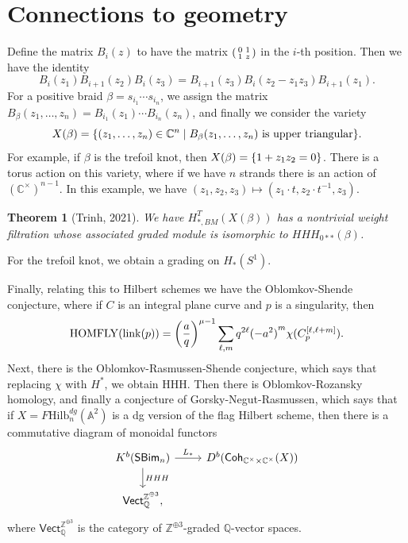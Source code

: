 \documentclass[leqno, openany]{memoir}
\newtheorem{thm}{Theorem}[section]
\theoremstyle{definition}
\theoremstyle{remark}
\theoremstyle{plain}
\theoremstyle{definition}
\theoremstyle{remark}
\newcommand{\A}{\mathbb{A}}
\newcommand{\C}{\mathbb{C}}
\newcommand{\Z}{\mathbb{Z}}
\newcommand{\Q}{\mathbb{Q}}
\newcommand{\mr}[1]{\mathrm{#1}}
\newcommand{\ms}[1]{\mathsf{#1}}
\begin{document}
\section{Connections to geometry}%
\label{sec:connections_to_geometry}

Define the matrix $B_i(z)$ to have the matrix $\begin{psmallmatrix}
    0 & 1 \\ 1 & z
\end{psmallmatrix}$ in the $i$-th position. Then we have the identity
\[ B_i(z_1) B_{i+1}(z_2) B_i(z_3) = B_{i+1}(z_3) B_i(z_2 - z_1 z_3) B_{i+1}(z_1). \]
For a positive braid $\beta = s_{i_1} \cdots s_{i_n}$, we assign the matrix $B_{\beta}(z_1, \ldots, z_n) = B_{i_1}(z_1) \cdots B_{i_n}(z_n)$, and finally we consider the variety 
\[ X(\beta) = \qty{(z_1, \ldots, z_n) \in \C^n \mid B_{\beta}(z_1, \ldots, z_n) \text{ is upper triangular}}. \]
For example, if $\beta$ is the trefoil knot, then $X(\beta) = \qty{1 + z_1 z_2 = 0}$. There is a torus action on this variety, where if we have $n$ strands there is an action of ${(\C^{\times})}^{n-1}$. In this example, we have $(z_1, z_2, z_3) \mapsto (z_1 \cdot t, z_2 \cdot t^{-1}, z_3)$.

\begin{thm}[Trinh, 2021]
    We have $H_{*,BM}^T(X(\beta))$ has a nontrivial weight filtration whose associated graded module is isomorphic to $HHH_{0**}(\beta)$.
\end{thm}

For the trefoil knot, we obtain a grading on $H_*(S^1)$.

Finally, relating this to Hilbert schemes we have the Oblomkov-Shende conjecture, where if $C$ is an integral plane curve and $p$ is a singularity, then
\[ \mr{HOMFLY}(\mr{link}(p)) = {\qty(\frac{a}{q})}^{\mu - 1} \sum_{\ell,m} q^{2\ell} {(-a^2)}^m \chi(C_p^{[\ell,\ell+m]}). \]
Next, there is the Oblomkov-Rasmussen-Shende conjecture, which says that replacing $\chi$ with $H^*$, we obtain HHH. Then there is Oblomkov-Rozansky homology, and finally a conjecture of Gorsky-Negut-Rasmussen, which says that if $X = F \mr{Hilb}_n^{dg}(\A^2)$ is a dg version of the flag Hilbert scheme, then there is a commutative diagram of monoidal functors
\begin{equation*}
\begin{tikzcd}
    K^b(\ms{SBim}_n) \ar{r}{L_*} \ar{d}{HHH} & D^b(\ms{Coh}_{\C^{\times} \times \C^{\times}}(X)) \\
    \ms{Vect}_{\Q}^{\Z^{\oplus 3}},
\end{tikzcd}
\end{equation*}
where $\ms{Vect}_{\Q}^{\Z^{\oplus 3}}$ is the category of $\Z^{\oplus 3}$-graded $\Q$-vector spaces.
\end{document}
